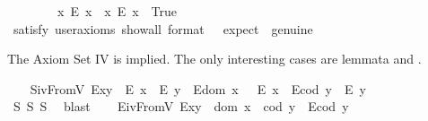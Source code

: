 \begin{isabellebody}
\isadelimproof
\ %
\endisadelimproof
%
\isatagproof
{}\isamarkupfalse%
%
\endisatagproof
{\isafoldproof}%
%
\isadelimproof
%
\endisadelimproof
\ \isanewline
\ \ \isamarkupfalse%
\ \ {\isachardoublequoteopen}{\isacharparenleft}{\isasymexists}x{\isachardot}\ \isactrlbold {\isasymnot}{\isacharparenleft}E\ x{\isacharparenright}{\isacharparenright}\ {\isasymand}\ {\isacharparenleft}{\isasymexists}x{\isachardot}\ {\isacharparenleft}E\ x{\isacharparenright}{\isacharparenright}{\isachardoublequoteclose}\ \ True\ \ %
\ \isanewline
\ \ \ \ \isamarkupfalse%
\ {\isacharbrackleft}satisfy{\isacharcomma}\ user{\isacharunderscore}axioms{\isacharcomma}\ show{\isacharunderscore}all{\isacharcomma}\ format\ {\isacharequal}\ {}{\isacharcomma}\ expect\ {\isacharequal}\ genuine{\isacharbrackright}%
\isadelimproof
\ %
\endisadelimproof
%
\isatagproof
{}\isamarkupfalse%
%
\endisatagproof
{\isafoldproof}%
%
\isadelimproof
%
\endisadelimproof
%
\begin{isamarkuptext}%
The Axiom Set IV is implied. The only interesting cases are 
 lemmata  and .%
\end{isamarkuptext}\isamarkuptrue%
\ \ \isamarkupfalse%
\ S\isactrlsub i\isactrlsub vFromV{\isacharcolon}\ {\isachardoublequoteopen}{\isacharparenleft}E{\isacharparenleft}x{\isasymcdot}y{\isacharparenright}\ \isactrlbold {\isasymrightarrow}\ {\isacharparenleft}E\ x\ \isactrlbold {\isasymand}\ E\ y{\isacharparenright}{\isacharparenright}\ \isactrlbold {\isasymand}\ {\isacharparenleft}E{\isacharparenleft}dom\ x\ {\isacharparenright}\ \isactrlbold {\isasymrightarrow}\ E\ x{\isacharparenright}\ \isactrlbold {\isasymand}\ {\isacharparenleft}E{\isacharparenleft}cod\ y{\isacharparenright}\ \isactrlbold {\isasymrightarrow}\ E\ y{\isacharparenright}{\isachardoublequoteclose}\ \ \ \isanewline
%
\isadelimproof
\ \ \ \ %
\endisadelimproof
%
\isatagproof
{}\isamarkupfalse%
\ S{}\ S{}\ S{}\ \isamarkupfalse%
\ blast%
\endisatagproof
{\isafoldproof}%
%
\isadelimproof
\isanewline
%
\endisadelimproof
\ \ \isamarkupfalse%
\ E\isactrlsub i\isactrlsub vFromV{\isacharcolon}\ {\isachardoublequoteopen}E{\isacharparenleft}x{\isasymcdot}y{\isacharparenright}\ \isactrlbold {\isasymleftrightarrow}\ {\isacharparenleft}dom\ x\ {\isasymcong}\ cod\ y\ \isactrlbold {\isasymand}\ E{\isacharparenleft}cod\ y{\isacharparenright}{\isacharparenright}{\isachardoublequoteclose}\ \isanewline

\end{isabellebody}
